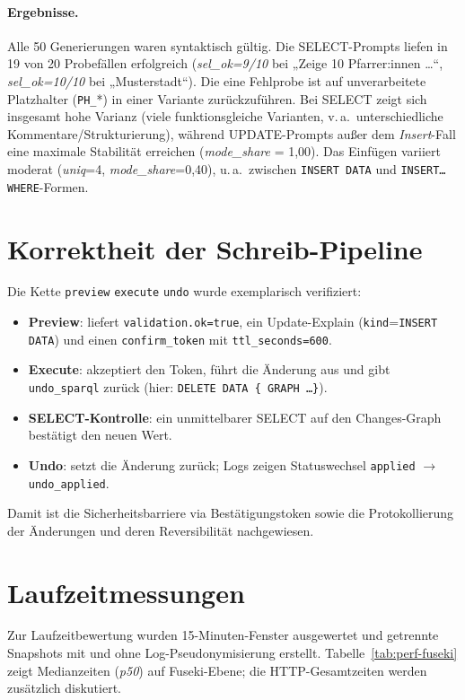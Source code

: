 \paragraph{Ergebnisse.}
Alle 50 Generierungen waren syntaktisch gültig. Die SELECT-Prompts liefen in 19 von 20 Probefällen erfolgreich (\emph{sel\_ok=9/10} bei „Zeige 10 Pfarrer:innen \dots“, \emph{sel\_ok=10/10} bei „Musterstadt“). Die eine Fehlprobe ist auf unverarbeitete Platzhalter (\texttt{PH\_}*) in einer Variante zurückzuführen. 
Bei SELECT zeigt sich insgesamt hohe Varianz (viele funktionsgleiche Varianten, v.\,a.\ unterschiedliche Kommentare/Strukturierung), während UPDATE-Prompts außer dem \emph{Insert}-Fall eine maximale Stabilität erreichen (\emph{mode\_share} = 1{,}00). Das Einfügen variiert moderat (\emph{uniq}=4, \emph{mode\_share}=0{,}40), u.\,a.\ zwischen \texttt{INSERT DATA} und \texttt{INSERT\ldots WHERE}-Formen. 

\section{Korrektheit der Schreib-Pipeline}
\label{subsec:write-pipeline}
Die Kette \texttt{preview} {\textrightarrow} \texttt{execute} {\textrightarrow} \texttt{undo} wurde exemplarisch verifiziert:
\begin{itemize}
  \item \textbf{Preview}: liefert \texttt{validation.ok=true}, ein Update-Explain (\texttt{kind}=\texttt{INSERT DATA}) und einen \texttt{confirm\_token} mit \texttt{ttl\_seconds=600}.
  \item \textbf{Execute}: akzeptiert den Token, führt die Änderung aus und gibt \texttt{undo\_sparql} zurück (hier: \texttt{DELETE DATA \{ GRAPH \dots \}}).
  \item \textbf{SELECT-Kontrolle}: ein unmittelbarer SELECT auf den Changes-Graph bestätigt den neuen Wert.
  \item \textbf{Undo}: setzt die Änderung zurück; Logs zeigen Statuswechsel \texttt{applied} $\rightarrow$ \texttt{undo\_applied}.
\end{itemize}
Damit ist die Sicherheitsbarriere via Bestätigungstoken sowie die Protokollierung der Änderungen und deren Reversibilität nachgewiesen.

\section{Laufzeitmessungen}
\label{subsec:performance}
Zur Laufzeitbewertung wurden 15-Minuten-Fenster ausgewertet und getrennte Snapshots mit und ohne Log-Pseudonymisierung erstellt. Tabelle~\ref{tab:perf-fuseki} zeigt Medianzeiten (\emph{p50}) auf Fuseki-Ebene; die HTTP-Gesamtzeiten werden zusätzlich diskutiert.

